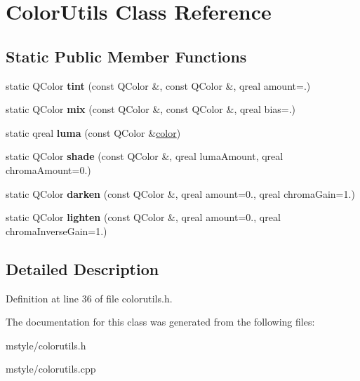 \hypertarget{class_color_utils}{}\section{Color\+Utils Class Reference}
\label{class_color_utils}
\subsection*{Static Public Member Functions}
\begin{DoxyCompactItemize}
\item 
\mbox{\label{class_color_utils_ab996e2b0f106b9fa23881b95d6691ba8}} 
static Q\+Color {\bfseries tint} (const Q\+Color \&, const Q\+Color \&, qreal amount=.)
\item 
\mbox{\label{class_color_utils_a5f7a98ca59776766c5d7235f5e710d4b}} 
static Q\+Color {\bfseries mix} (const Q\+Color \&, const Q\+Color \&, qreal bias=.)
\item 
\mbox{\label{class_color_utils_ac8eb2568d6328b33a769290e2dc4db10}} 
static qreal {\bfseries luma} (const Q\+Color \&\hyperlink{structcolor}{color})
\item 
\mbox{\label{class_color_utils_ad8f7ea1cfc919c4a8f76cccd6d0e7677}} 
static Q\+Color {\bfseries shade} (const Q\+Color \&, qreal luma\+Amount, qreal chroma\+Amount=0.)
\item 
\mbox{\label{class_color_utils_a61f66252be646f17e17f9badc6bc9cfa}} 
static Q\+Color {\bfseries darken} (const Q\+Color \&, qreal amount=0., qreal chroma\+Gain=1.)
\item 
\mbox{\label{class_color_utils_a53c1098a0085781663a1f113805690ff}} 
static Q\+Color {\bfseries lighten} (const Q\+Color \&, qreal amount=0., qreal chroma\+Inverse\+Gain=1.)
\end{DoxyCompactItemize}


\subsection{Detailed Description}


Definition at line 36 of file colorutils.\+h.



The documentation for this class was generated from the following files\+:\begin{DoxyCompactItemize}
\item 
mstyle/colorutils.\+h\item 
mstyle/colorutils.\+cpp\end{DoxyCompactItemize}

